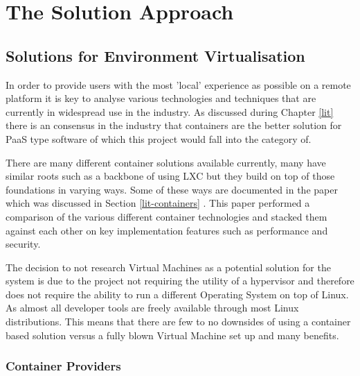 \chapter{The Solution Approach}

\section{Solutions for Environment Virtualisation}
In order to provide users with the most 'local' experience as possible on a remote platform it is key to analyse various technologies and techniques that are currently in widespread use in the industry. As discussed during Chapter \ref{lit} there is an consensus in the industry that containers are the better solution for PaaS type software of which this project would fall into the category of.

There are many different container solutions available currently, many have similar roots such as a backbone of using LXC but they build on top of those foundations in varying ways. Some of these ways are documented in the paper which was discussed in Section \ref{lit-containers} \cite{contsvsvirt}. This paper performed a comparison of the various different container technologies and stacked them against each other on key implementation features such as performance and security. 

The decision to not research Virtual Machines as a potential solution for the system is due to the project not requiring the utility of a hypervisor and therefore does not require the ability to run a different Operating System on top of Linux. As almost all developer tools are freely available through most Linux distributions. This means that there are few to no downsides of using a container based solution versus a fully blown Virtual Machine set up and many benefits.

\subsection{Container Providers}

